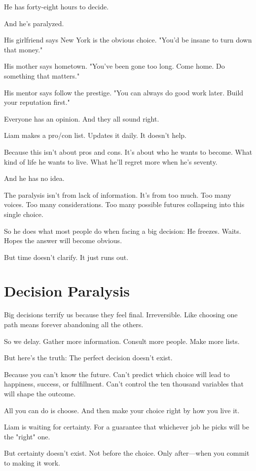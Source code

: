\documentclass[11pt,twoside]{book}
\begin{document}
He has forty-eight hours to decide.

And he's paralyzed.

His girlfriend says New York is the obvious choice. "You'd be insane to turn down that money."

His mother says hometown. "You've been gone too long. Come home. Do something that matters."

His mentor says follow the prestige. "You can always do good work later. Build your reputation first."

Everyone has an opinion. And they all sound right.

Liam makes a pro/con list. Updates it daily. It doesn't help.

Because this isn't about pros and cons. It's about who he wants to become. What kind of life he wants to live. What he'll regret more when he's seventy.

And he has no idea.

The paralysis isn't from lack of information. It's from too much. Too many voices. Too many considerations. Too many possible futures collapsing into this single choice.

So he does what most people do when facing a big decision: He freezes. Waits. Hopes the answer will become obvious.

But time doesn't clarify. It just runs out.

\section*{Decision Paralysis}

Big decisions terrify us because they feel final. Irreversible. Like choosing one path means forever abandoning all the others.

So we delay. Gather more information. Consult more people. Make more lists.

But here's the truth: The perfect decision doesn't exist.

Because you can't know the future. Can't predict which choice will lead to happiness, success, or fulfillment. Can't control the ten thousand variables that will shape the outcome.

All you can do is choose. And then make your choice right by how you live it.

Liam is waiting for certainty. For a guarantee that whichever job he picks will be the "right" one.

But certainty doesn't exist. Not before the choice. Only after—when you commit to making it work.
\end{document}
